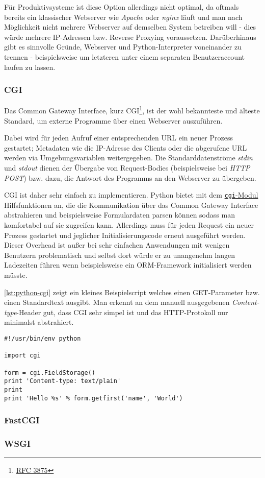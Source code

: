 Für Produktivsysteme ist diese Option allerdings nicht optimal, da oftmals bereits ein klassischer
Webserver wie \emph{Apache} oder \emph{nginx} läuft und man nach Möglichkeit nicht mehrere Webserver
auf demselben System betreiben will - dies würde mehrere IP-Adressen bzw. Reverse Proxying
voraussetzen. Darüberhinaus gibt es sinnvolle Gründe, Webserver und Python-Interpreter voneinander
zu trennen - beispielsweise um letzteren unter einem separaten Benutzeraccount laufen zu lassen.

\subsubsection{CGI}

Das Common Gateway Interface, kurz CGI\footnote{\href{http://www.ietf.org/rfc/rfc3875}{RFC 3875}},
ist der wohl bekannteste und älteste Standard, um externe Programme über einen Webserver
auszuführen.

Dabei wird für jeden Aufruf einer entsprechenden URL ein neuer Prozess gestartet; Metadaten wie die
IP-Adresse des Clients oder die abgerufene URL werden via Umgebungsvariablen weitergegeben. Die
Standarddatenströme \emph{stdin} und \emph{stdout} dienen der Übergabe von Request-Bodies
(beispielsweise bei \emph{HTTP POST}) bzw. dazu, die Antwort des Programms an den Webserver
zu übergeben.

CGI ist daher sehr einfach zu implementieren. Python bietet mit dem
\href{http://docs.python.org/library/cgi.html}{\lstinline{cgi}-Modul} Hilfsfunktionen an, die die
Kommunikation über das Common Gateway Interface abstrahieren und beispielsweise Formulardaten
parsen können sodass man komfortabel auf sie zugreifen kann. Allerdings muss für jeden Request ein
neuer Prozess gestartet und jeglicher Initialisierungscode erneut ausgeführt werden. Dieser Overhead
ist außer bei sehr einfachen Anwendungen mit wenigen Benutzern problematisch und selbst dort würde
er zu unangenehm langen Ladezeiten führen wenn beispielsweise ein ORM-Framework initialisiert werden
müsste.

\autoref{lst:python-cgi} zeigt ein kleines Beispielscript welches einen GET-Parameter bzw. einen
Standardtext ausgibt. Man erkennt an dem manuell ausgegebenen \emph{Content-type}-Header gut, dass
CGI sehr simpel ist und das HTTP-Protokoll nur minimalst abstrahiert.

\begin{lstlisting}[caption=Python-CGI-Skript,label=lst:python-cgi]
#!/usr/bin/env python

import cgi

form = cgi.FieldStorage()
print 'Content-type: text/plain'
print
print 'Hello %s' % form.getfirst('name', 'World')
\end{lstlisting}

\subsubsection{FastCGI}


\subsubsection{WSGI}


